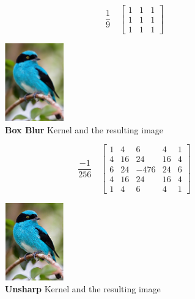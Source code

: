 \FloatBarrier
\begin{figure}[h]
\begin{minipage}[b]{0.5\linewidth}
\centering
    $$
    \frac{1}{9}
    \quad
    \begin{bmatrix} 
    1 & 1 & 1 \\
    1 & 1 & 1 \\
    1 & 1 & 1
    \end{bmatrix}
    $$
\caption{\textbf{Box Blur} Kernel and the resulting image}
\end{minipage}
\begin{minipage}[b]{0.3\linewidth}
\centering
\includegraphics[width=1in]{graphics/convolution/Convolution_gebs_KernelBoxBlur.png}
\end{minipage}
\label{fig:Box Blur Kernel}
\end{figure}
\FloatBarrier
\begin{figure}[h]
\begin{minipage}[b]{0.5\linewidth}
\centering
    $$
    \frac{-1}{256}
    \quad
    \begin{bmatrix} 
    1 & 4 & 6 & 4 & 1 \\
    4 & 16 & 24 & 16 & 4 \\
    6 & 24 & -476 & 24 & 6 \\
    4 & 16 & 24 & 16 & 4 \\
    1 & 4 & 6 & 4 & 1
    \end{bmatrix}
    $$
\caption{\textbf{Unsharp} Kernel and the resulting image}
\end{minipage}
\begin{minipage}[b]{0.3\linewidth}
\centering
\includegraphics[width=1in]{graphics/convolution/Convolution_gebs_KernelUnsharp5x5.png}
\end{minipage}
\label{fig:Unsharp Kernel}
\end{figure}
